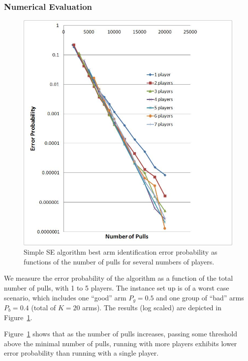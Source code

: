 \documentclass{sig-alternate}
\newcommand{\comment}[1]{}
\begin{document}
\subsubsection{Numerical Evaluation}

\begin{figure}[t]
\centering
\includegraphics[scale=0.5]{figures/Error_Prob_Separate_SE_v1.jpg}
\caption{Simple SE algorithm best arm identification error probability as functions of the number of pulls for several numbers of players.}
\label{fig:Fagin1StepError}
\end{figure}

We measure the error probability of the algorithm as a function of the total number of pulls, with 1 to 5 players. The instance set up is of a worst case scenario, which includes one ``good'' arm $P_g=0.5$ and one group of ``bad'' arms $P_b=0.4$ (total of $K=20$ arms). The results (log scaled) are depicted in Figure~\ref{fig:Fagin1StepError}.

\comment{In a distributed setting the total number of pulls are equally divided among all players, moreover, the share of each player is divided into $K$ phases. As a result, there is a minimal number of pulls $n^x$ required to allow running the game with $x$ players; namely, allowing each player to pull at least once each surviving arm per phase.}
Figure~\ref{fig:Fagin1StepError} shows that as the number of pulls increases, passing some threshold above the minimal number of pulls, running with more players exhibits lower error probability than running with a single player.
\end{document}
